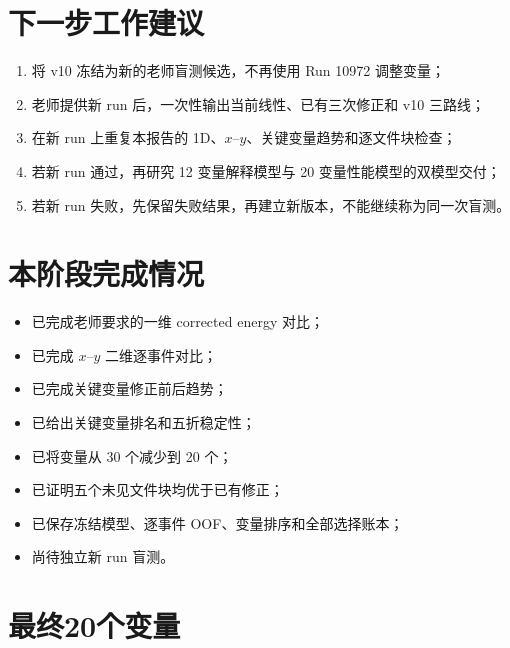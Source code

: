 \documentclass[11pt,a4paper]{ctexart}
\begin{document}
\section{下一步工作建议}

\begin{enumerate}
  \item 将 v10 冻结为新的老师盲测候选，不再使用 Run 10972 调整变量；
  \item 老师提供新 run 后，一次性输出当前线性、已有三次修正和 v10 三路线；
  \item 在新 run 上重复本报告的 1D、$x$--$y$、关键变量趋势和逐文件块检查；
  \item 若新 run 通过，再研究 12 变量解释模型与 20 变量性能模型的双模型交付；
  \item 若新 run 失败，先保留失败结果，再建立新版本，不能继续称为同一次盲测。
\end{enumerate}

\section*{本阶段完成情况}

\begin{itemize}
  \item 已完成老师要求的一维 corrected energy 对比；
  \item 已完成 $x$--$y$ 二维逐事件对比；
  \item 已完成关键变量修正前后趋势；
  \item 已给出关键变量排名和五折稳定性；
  \item 已将变量从 30 个减少到 20 个；
  \item 已证明五个未见文件块均优于已有修正；
  \item 已保存冻结模型、逐事件 OOF、变量排序和全部选择账本；
  \item 尚待独立新 run 盲测。
\end{itemize}

\clearpage
\appendix
\section{最终20个变量}
\end{document}
